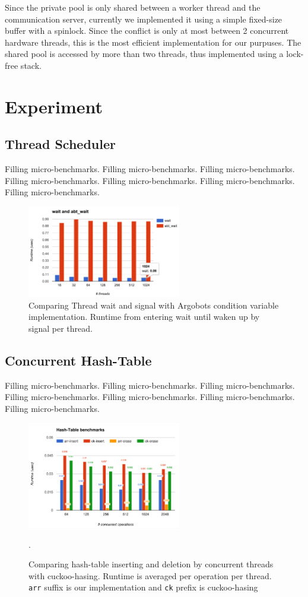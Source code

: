 \documentclass{sig-alternate-05-2015}
\begin{document}
Since the private pool is only shared between a worker thread and the
communication server, currently we implemented it using a simple fixed-size
buffer with a spinlock. Since the conflict is only at most between 2 concurrent
hardware threads, this is the most efficient implementation for our purpuses.
The shared pool is accessed by more than two threads, thus implemented using a
lock-free stack.

\section{Experiment}
\subsection{Thread Scheduler}
Filling micro-benchmarks.
Filling micro-benchmarks.
Filling micro-benchmarks.
Filling micro-benchmarks.
Filling micro-benchmarks.
Filling micro-benchmarks.
Filling micro-benchmarks.

\begin{figure}[h]
  \centering 
  \includegraphics[width=0.6\textwidth]{fig/thread.png}
  \caption{Comparing Thread wait and signal with Argobots condition variable
  implementation. Runtime from entering wait until waken up by signal per thread.}
\end{figure}

\subsection{Concurrent Hash-Table}
Filling micro-benchmarks.
Filling micro-benchmarks.
Filling micro-benchmarks.
Filling micro-benchmarks.
Filling micro-benchmarks.
Filling micro-benchmarks.
Filling micro-benchmarks.


\begin{figure}[h!]
  \centering 
  \includegraphics[width=0.6\textwidth]{fig/hashtbl.png}
  \caption{Comparing hash-table inserting and deletion by concurrent threads
    with cuckoo-hasing.  Runtime is averaged per operation per thread.
    \texttt{arr} suffix is our implementation and \texttt{ck} prefix is cuckoo-hasing}.
\end{figure}
\end{document}
